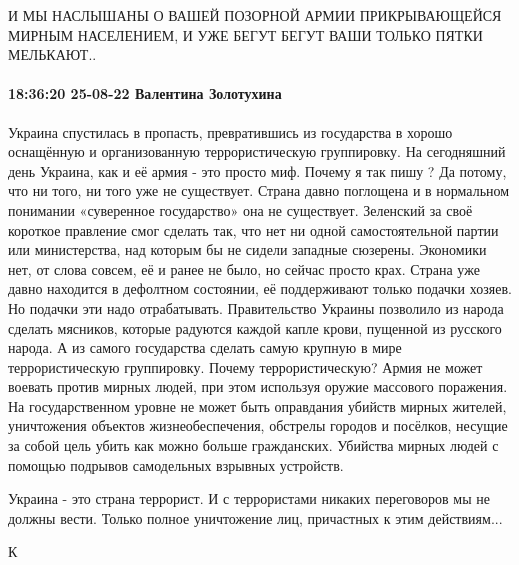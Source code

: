 И МЫ НАСЛЫШАНЫ О ВАШЕЙ ПОЗОРНОЙ АРМИИ ПРИКРЫВАЮЩЕЙСЯ МИРНЫМ НАСЕЛЕНИЕМ, И УЖЕ
БЕГУТ БЕГУТ ВАШИ ТОЛЬКО ПЯТКИ МЕЛЬКАЮТ..


\paragraph{18:36:20 25-08-22 Валентина Золотухина}

Украина спустилась в пропасть, превратившись из государства в хорошо оснащённую
и организованную террористическую группировку. На сегодняшний день Украина, как
и её армия - это просто миф. Почему я так пишу ? Да потому, что ни того, ни
того уже не существует. Страна давно поглощена и в нормальном понимании
«суверенное государство» она не существует. Зеленский за своё короткое
правление смог сделать так, что нет ни одной самостоятельной партии или
министерства, над которым бы не сидели западные сюзерены. Экономики нет, от
слова совсем, её и ранее не было, но сейчас просто крах. Страна уже давно
находится в дефолтном состоянии, её поддерживают только подачки хозяев. Но
подачки эти надо отрабатывать. Правительство Украины позволило из народа
сделать мясников, которые радуются каждой капле крови, пущенной из русского
народа. А из самого государства сделать самую крупную в мире террористическую
группировку. Почему террористическую? Армия не может воевать против мирных
людей, при этом используя оружие массового поражения. На государственном уровне
не может быть оправдания убийств мирных жителей, уничтожения объектов
жизнеобеспечения, обстрелы городов и посёлков, несущие за собой цель убить как
можно больше гражданских. Убийства мирных людей с помощью подрывов самодельных
взрывных устройств.

Украина - это страна террорист. И с террористами никаких переговоров мы не
должны вести. Только полное уничтожение лиц, причастных к этим действиям...

К 
